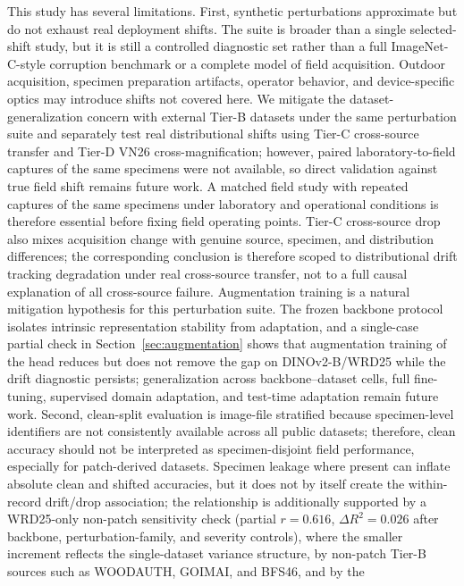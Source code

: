 \documentclass[a4paper,fleqn]{els-cas-templates/cas-sc}
\begin{document}
This study has several limitations. First, synthetic perturbations approximate
but do not exhaust real deployment shifts. The suite is broader than a single
selected-shift study, but it is still a controlled diagnostic set rather than a
full ImageNet-C-style corruption benchmark or a complete model of field
acquisition. Outdoor acquisition, specimen preparation artifacts, operator
behavior, and device-specific optics may introduce shifts not covered here. We
mitigate the dataset-generalization concern with external Tier-B datasets under
the same perturbation suite and separately test real distributional shifts using
Tier-C cross-source transfer and Tier-D VN26 cross-magnification; however, paired
laboratory-to-field captures of the same specimens were not available, so direct
validation against true field shift remains future work. A matched field study
with repeated captures of the same specimens under laboratory and operational
conditions is therefore essential before fixing field operating points. Tier-C cross-source
drop also mixes acquisition change with genuine source, specimen, and
distribution differences; the corresponding conclusion is therefore scoped to
distributional drift tracking degradation under real cross-source transfer, not
to a full causal explanation of all cross-source failure. Augmentation training
is a natural mitigation hypothesis for this perturbation suite. The frozen
backbone protocol isolates intrinsic representation stability from adaptation,
and a single-case partial check in
Section~\ref{sec:augmentation} shows that augmentation training of the head
reduces but does not remove the gap on DINOv2-B/WRD25 while the drift diagnostic
persists; generalization across backbone--dataset cells, full fine-tuning,
supervised domain adaptation, and test-time adaptation remain future work.
Second, clean-split evaluation is image-file stratified because specimen-level
identifiers are not consistently available across all public datasets; therefore,
clean accuracy should not be interpreted as specimen-disjoint field performance,
especially for patch-derived datasets. Specimen leakage where present can
inflate absolute clean and shifted accuracies, but it does not by itself create
the within-record drift/drop association; the relationship is additionally
supported by a WRD25-only non-patch sensitivity check (partial $r=0.616$,
$\Delta R^2=0.026$ after backbone, perturbation-family, and severity controls),
where the smaller increment reflects the single-dataset variance structure,
by non-patch Tier-B sources such as WOODAUTH, GOIMAI, and BFS46, and by the
\end{document}
